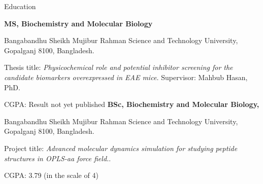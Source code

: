 \begin{rubric}{Education}

\entry*[2020 -- 2021]%
	\textbf{MS, Biochemistry and Molecular Biology}\par
	Bangabandhu Sheikh Mujibur Rahman Science and Technology University, Gopalganj 8100, Bangladesh.\par
	Thesis title: \emph{Physicochemical role and potential inhibitor screening for the candidate biomarkers overexpressed in EAE mice.} Supervisor: Mahbub Hasan, PhD.\par
	CGPA: Result not yet published
%
\entry*[2016 -- 2019]%
	\textbf{BSc, Biochemistry and Molecular Biology, }\par
	Bangabandhu Sheikh Mujibur Rahman Science and Technology University, Gopalganj 8100, Bangladesh.\par
	Project title: \emph{Advanced molecular dynamics simulation for studying peptide structures in OPLS-aa force field.}.\par
	CGPA: 3.79 (in the scale of 4)
\end{rubric}